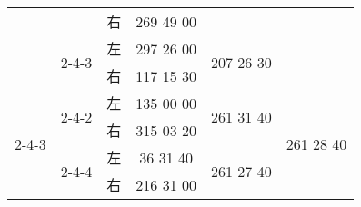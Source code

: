 \documentclass[UTF8]{ctexart}
\begin{document}
\begin{table}[h]
\begin{tabular}{|c|c|c|c|c|c|}
			&                         & 右                   & 269 49 00                                                                                                &                                                                                                         &                                                                                                         \\ \cline{2-5}
			& \multirow{2}{*}{2-4-3}  & 左                   & 297 26 00                                                                                                & \multirow{2}{*}{207 26 30}                                                                              &                                                                                                         \\ \cline{3-4}
			&                         & 右                   & 117 15 30                                                                                                &                                                                                                         &                                                                                                         \\ \hline
			\multirow{4}{*}{2-4-3}  & \multirow{2}{*}{2-4-2}  & 左                   & 135 00 00                                                                                                & \multirow{2}{*}{261 31 40}                                                                              & \multirow{4}{*}{261 28 40}                                                                              \\ \cline{3-4}
			&                         & 右                   & 315 03 20                                                                                                &                                                                                                         &                                                                                                         \\ \cline{2-5}
			& \multirow{2}{*}{2-4-4}  & 左                   & 36 31 40                                                                                                 & \multirow{2}{*}{261 27 40}                                                                              &                                                                                                         \\ \cline{3-4}
			&                         & 右                   & 216 31 00                                                                                                &                                                                                                         &                                                                                                         \\ \hline

\end{tabular}
\end{table}
\end{document}
